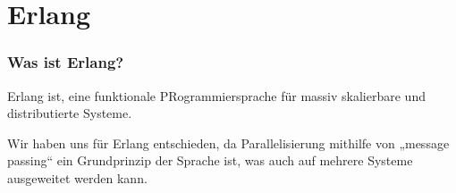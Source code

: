 \documentclass[compress]{beamer}
\begin{document}



\section{Erlang}
\label{sec:erlang}

\begin{frame}
  \frametitle{Was ist Erlang?}

  Erlang ist, eine funktionale PRogrammiersprache für massiv
  skalierbare und distributierte Systeme.

  Wir haben uns für Erlang entschieden, da Parallelisierung mithilfe
  von „message passing“ ein Grundprinzip der Sprache ist, was auch auf
  mehrere Systeme ausgeweitet werden kann.
\end{frame}
\end{document}
